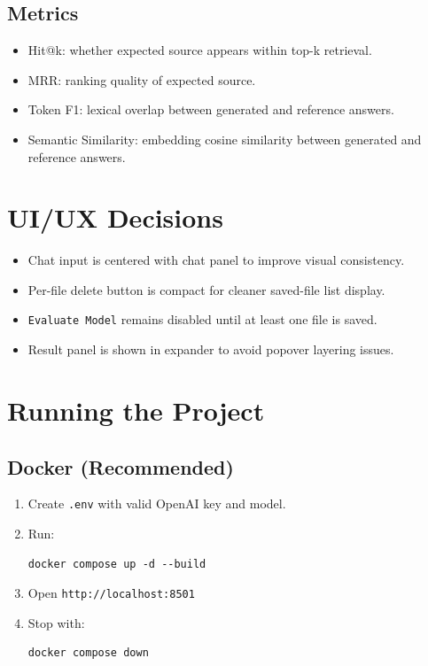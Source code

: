 \documentclass[11pt,a4paper]{article}
\begin{document}
\subsection{Metrics}
\begin{itemize}[leftmargin=*]
\item Hit@k: whether expected source appears within top-k retrieval.
\item MRR: ranking quality of expected source.
\item Token F1: lexical overlap between generated and reference answers.
\item Semantic Similarity: embedding cosine similarity between generated and reference answers.
\end{itemize}

\section{UI/UX Decisions}
\begin{itemize}[leftmargin=*]
\item Chat input is centered with chat panel to improve visual consistency.
\item Per-file delete button is compact for cleaner saved-file list display.
\item \texttt{Evaluate Model} remains disabled until at least one file is saved.
\item Result panel is shown in expander to avoid popover layering issues.
\end{itemize}

\section{Running the Project}
\subsection{Docker (Recommended)}
\begin{enumerate}[leftmargin=*]
\item Create \texttt{.env} with valid OpenAI key and model.
\item Run:
\begin{verbatim}
docker compose up -d --build
\end{verbatim}
\item Open \texttt{http://localhost:8501}
\item Stop with:
\begin{verbatim}
docker compose down
\end{verbatim}
\end{enumerate}
\end{document}
